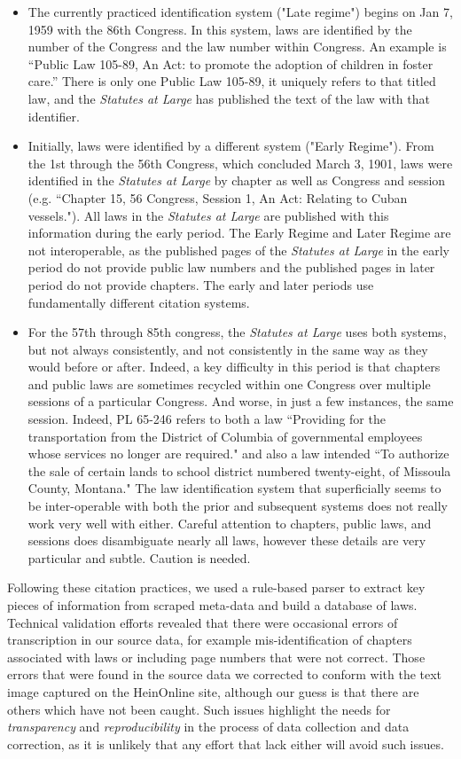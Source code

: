 \documentclass[fleqn,10pt]{wlscirep}
\begin{document}
\begin{itemize}
\item The currently practiced identification system ("Late regime") begins on Jan 7, 1959 with the 86th Congress. In this system, laws are identified by the number of the Congress and the law number within Congress. An example is ``Public Law 105-89, An Act: to promote the adoption of children in foster care.'' There is only one Public Law 105-89, it uniquely refers to that titled law, and the \emph{Statutes at Large} has published the text of the law with that identifier.
\item Initially, laws were identified by a different system ("Early Regime"). From the 1st through the 56th Congress, which concluded March 3, 1901, laws were identified in the \emph{Statutes at Large} by chapter as well as Congress and session (e.g. ``Chapter 15, 56 Congress, Session 1, An Act: Relating to Cuban vessels."). All laws in the \emph{Statutes at Large} are published with this information during the early period. The Early Regime and Later Regime are not interoperable, as the published pages of the \emph{Statutes at Large} in the early period do not provide public law numbers and the published pages in later period do not provide chapters. The early and later periods use fundamentally different citation systems.
\item For the 57th through 85th congress, the \emph{Statutes at Large} uses both systems, but not always consistently, and not consistently in the same way as they would before or after. Indeed, a key difficulty in this period is that chapters and public laws are sometimes recycled within one Congress over multiple sessions of a particular Congress. And worse, in just a few instances, the same session. Indeed, PL 65-246 refers to both a law ``Providing for the transportation from the District of Columbia of governmental employees whose services no longer are required." and also a law intended ``To authorize the sale of certain lands to school district numbered twenty-eight, of Missoula County, Montana." The law identification system that superficially seems to be inter-operable with both the prior and subsequent systems does not really work very well with either.  Careful attention to chapters, public laws, and sessions does disambiguate nearly all laws, however these details are very particular and subtle. Caution is needed.
\end{itemize}

 Following these citation practices, we used a rule-based parser to extract key pieces of information from scraped meta-data and build a database of laws. Technical validation efforts revealed that there were occasional errors of transcription in our source data, for example mis-identification of chapters associated with laws or including page numbers that were not correct. Those errors that were found in the source data we corrected to conform with the text image captured on the HeinOnline site, although our guess is that there are others which have not been caught. Such issues highlight the needs for \textit{transparency} and \textit{reproducibility} in the process of data collection and data correction, as it is unlikely that any effort that lack either will avoid such issues. 
 
\end{document}
